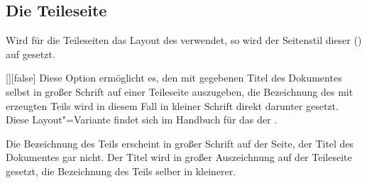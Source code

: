\subsection{Die Teileseite}
\label{sec:part}
%
Wird für die Teileseiten das Layout des \CDs verwendet, so wird der Seitenstil 
dieser () auf  gesetzt.

\begin{Declaration}{[\PBoolean]}[false]%
\printdeclarationlist%
%
%
Diese Option ermöglicht es, den mit  gegebenen Titel des 
Dokumentes selbst in großer Schrift auf einer Teileseite auszugeben, die 
Bezeichnung des mit  erzeugten Teils wird 
in diesem Fall in kleiner Schrift direkt darunter gesetzt. Diese 
Layout"=Variante findet sich im Handbuch für das \CD der \TnUD. \notudscrartcl
%
\begin{values}
\itemfalse
  Die Bezeichnung des Teils erscheint in großer Schrift auf der Seite, der 
  Titel des Dokumentes gar nicht.
\itemtrue*
  Der Titel wird in großer Auszeichnung auf der Teileseite gesetzt, die 
  Bezeichnung des Teils selber in kleinerer.
\end{values}
\end{Declaration}


